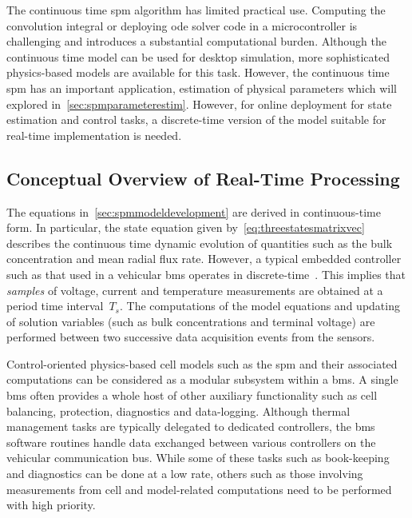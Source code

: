 

The continuous time \gls{spm} algorithm has limited practical use. Computing the
convolution integral or deploying \gls{ode}  solver code in a microcontroller is
challenging  and introduces  a  substantial computational  burden. Although  the
continuous time  model can  be used for  desktop simulation,  more sophisticated
physics-based  models  are available  for  this  task. However,  the  continuous
time  \gls{spm} has  an  important application,  \viz{}  estimation of  physical
parameters  which will  explored  in~\cref{sec:spmparameterestim}. However,  for
online  deployment  for state  estimation  and  control tasks,  a  discrete-time
version of the model suitable for real-time implementation is needed.

\subsection{Conceptual Overview of Real-Time Processing}

The equations  in~\cref{sec:spmmodeldevelopment} are derived  in continuous-time
form. In particular, the  state equation given by~\cref{eq:threestatesmatrixvec}
describes  the  continuous   time  dynamic  evolution  of   quantities  such  as
the  bulk  concentration   and  mean  radial  flux  rate.   However,  a  typical
embedded  controller  such  as  that  used in  a  vehicular  \gls{bms}  operates
in   discrete-time~\cite{Andrea2010}.  This   implies  that   \emph{samples}  of
voltage,  current and  temperature measurements  are obtained  at a  period time
interval~$T_s$. The computations of the model equations and updating of solution
variables  (such as  bulk  concentrations and  terminal  voltage) are  performed
between two successive data acquisition events from the sensors.


Control-oriented  physics-based cell  models  such as  the  \gls{spm} and  their
associated  computations can  be  considered  as a  modular  subsystem within  a
\gls{bms}. A  single \gls{bms} often  provides a  whole host of  other auxiliary
functionality such as cell  balancing, protection, diagnostics and data-logging.
Although  thermal   management  tasks  are  typically   delegated  to  dedicated
controllers,  the  \gls{bms} software  routines  handle  data exchanged  between
various  controllers on  the vehicular  communication bus.  While some  of these
tasks such  as book-keeping and  diagnostics can be done  at a low  rate, others
such as  those involving measurements  from cell and  model-related computations
need to be performed with high priority.

